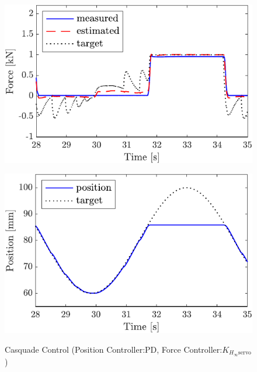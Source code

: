 \begin{figure}[t]
    \begin{minipage}{\minipageratio\hsize}
    \centering
        \includegraphics[keepaspectratio, scale = \minifigscale]{contents/IntegrationControl/figure/SECASQ/crop-FBcsqtch_JFPS4_Notrq_posPIDadjust_force.pdf}
        \label{fig5:crop-FBcsqtch_JFPS4_Notrq_posPIDadjust_force}
    \end{minipage}
    \begin{minipage}{\minipageratio\hsize}
    \centering
        \includegraphics[keepaspectratio, scale = \minifigscale]{contents/IntegrationControl/figure/SECASQ/crop-FBcsqtch_JFPS4_Notrq_posPIDadjust_pos.pdf}
        \label{fig5:crop-FBcsqtch_JFPS4_Notrq_posPIDadjust_pos}
    \end{minipage}
    \caption{Casquade Control (Position Controller:PD, Force Controller:$K_{H_\infty\mathrm{servo}}$)}  
    \label{fig5:crop-FBcsqtch_JFPS4_Notrq_posPIDadjust}
\end{figure}

